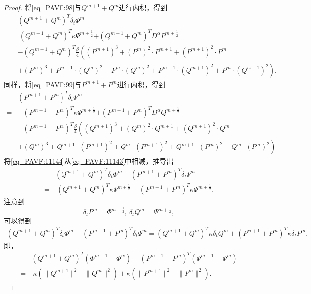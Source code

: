 \begin{proof}
将\eqref{eq_PAVF:98}与$Q^{m+1}+Q^{m}$进行内积，得到
\begin{align}
&(Q^{m+1}+Q^{m})^{T}\delta_{t} \varPhi^{m}\nonumber\\
=&~(Q^{m+1}+Q^{m})^{T}\kappa \Psi^{m+\frac{1}{2}}{+(Q^{m+1}+Q^{m})^{T}D^{\alpha} P^{m+\frac{1}{2}}}\nonumber\\
&-(Q^{m+1}+Q^{m})^{T}\frac{\beta}{4}\left((P^{m+1})^3+(P^{m})^{2}\cdot P^{m+1}+(P^{m+1})^{2}\cdot P^{m}\right.\nonumber\\
&\left.+(P^{m})^{3}+P^{m+1}\cdot (Q^{m})^{2}+P^{m}\cdot (Q^{m})^{2}+P^{m+1}\cdot (Q^{m+1})^{2}+P^{m}\cdot (Q^{m+1})^{2}\right).\label{eq_PAVF:11143}
\end{align}
同样，将\eqref{eq_PAVF:99}与$P^{m+1}+P^{m}$进行内积，得到
\begin{align}
&(P^{m+1}+P^{m})^{T}\delta_{t} \Psi^{m}\nonumber\\
=&-(P^{m+1}+P^{m})^{T}\kappa \varPhi^{m+\frac{1}{2}}{+(P^{m+1}+P^{m})^{T}D^{\alpha} Q^{m+\frac{1}{2}}}\nonumber\\
&-(P^{m+1}+P^{m})^{T}\frac{\beta}{4}\left((Q^{m+1})^3+(Q^{m})^{2}\cdot Q^{m+1}+(Q^{m+1})^{2}\cdot Q^{m}\right.\nonumber\\
&\left.+(Q^{m})^{3}+Q^{m+1}\cdot (P^{m+1})^{2}+Q^{m}\cdot (P^{m+1})^{2}+Q^{m+1}\cdot (P^{m})^{2}+Q^{m}\cdot (P^{m})^{2}\right)\label{eq_PAVF:11144}
\end{align}
将\eqref{eq_PAVF:11144}从\eqref{eq_PAVF:11143}中相减，推导出
\begin{align}
&(Q^{m+1}+Q^{m})^{T}\delta_{t} \varPhi^{m}-(P^{m+1}+P^{m})^{T}\delta_{t} \Psi^{m}\nonumber\\
=&~(Q^{m+1}+Q^{m})^{T}\kappa \Psi^{m+\frac{1}{2}}+(P^{m+1}+P^{m})^{T}\kappa \varPhi^{m+\frac{1}{2}}.\label{eq_PAVF:11145}
\end{align}
注意到
$$\delta_t P^m=\varPhi^{m+\frac{1}{2}},~\delta_t Q^m=\Psi^{m+\frac{1}{2}},$$
可以得到
\begin{align}\label{eq_PAVF:11146}
(Q^{m+1}+Q^{m})^{T}\delta_{t} \varPhi^{m}\!-\!(P^{m+1}+P^{m})^{T}\delta_{t} \Psi^{m}=(Q^{m+1}+Q^{m})^{T}\kappa \delta_t Q^m+(P^{m+1}+P^{m})^{T}\kappa \delta_t P^m.
\end{align}
即，
\begin{align}
&(Q^{m+1}+Q^{m})^{T}(\varPhi^{m+1}-\varPhi^{m})-(P^{m+1}+P^{m})^{T}(\Psi^{m+1}-\Psi^{m})\nonumber\\
=&~\kappa (\|Q^{m+1}\|^2-\|Q^{m}\|^2)+\kappa (\|P^{m+1}\|^2-\|P^{m}\|^2).\label{eq_PAVF:11147}
\end{align}

\end{proof}
